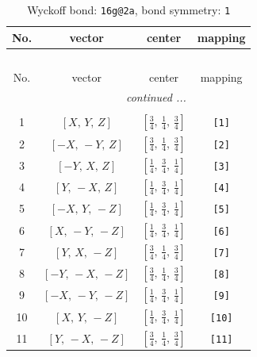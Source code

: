 \documentclass[fleqn,8pt]{jsarticle}
\begin{document}
\begin{longtable}{cccc}
\caption{Wyckoff bond: {\tt 16g@2a}, bond symmetry: {\tt 1}}
 \\
 \hline \hline
No. & vector & center & mapping \\ \hline \endfirsthead

\multicolumn{3}{l}{\tablename\ \thetable{}} \\
 \hline \hline
No. & vector & center & mapping \\ \hline \endhead

 \hline \hline
\multicolumn{3}{r}{\footnotesize\it continued ...} \\ \endfoot

 \hline \hline
\multicolumn{3}{r}{} \\ \endlastfoot

1 & $\left[ X,\, Y,\, Z \right]$ & $\left[ \frac{3}{4},\, \frac{1}{4},\, \frac{3}{4} \right]$ & {\tt [1]} \\ \hline
2 & $\left[ - X,\, - Y,\, Z \right]$ & $\left[ \frac{3}{4},\, \frac{1}{4},\, \frac{3}{4} \right]$ & {\tt [2]} \\ \hline
3 & $\left[ - Y,\, X,\, Z \right]$ & $\left[ \frac{1}{4},\, \frac{3}{4},\, \frac{1}{4} \right]$ & {\tt [3]} \\ \hline
4 & $\left[ Y,\, - X,\, Z \right]$ & $\left[ \frac{1}{4},\, \frac{3}{4},\, \frac{1}{4} \right]$ & {\tt [4]} \\ \hline
5 & $\left[ - X,\, Y,\, - Z \right]$ & $\left[ \frac{1}{4},\, \frac{3}{4},\, \frac{1}{4} \right]$ & {\tt [5]} \\ \hline
6 & $\left[ X,\, - Y,\, - Z \right]$ & $\left[ \frac{1}{4},\, \frac{3}{4},\, \frac{1}{4} \right]$ & {\tt [6]} \\ \hline
7 & $\left[ Y,\, X,\, - Z \right]$ & $\left[ \frac{3}{4},\, \frac{1}{4},\, \frac{3}{4} \right]$ & {\tt [7]} \\ \hline
8 & $\left[ - Y,\, - X,\, - Z \right]$ & $\left[ \frac{3}{4},\, \frac{1}{4},\, \frac{3}{4} \right]$ & {\tt [8]} \\ \hline
9 & $\left[ - X,\, - Y,\, - Z \right]$ & $\left[ \frac{1}{4},\, \frac{3}{4},\, \frac{1}{4} \right]$ & {\tt [9]} \\ \hline
10 & $\left[ X,\, Y,\, - Z \right]$ & $\left[ \frac{1}{4},\, \frac{3}{4},\, \frac{1}{4} \right]$ & {\tt [10]} \\ \hline
11 & $\left[ Y,\, - X,\, - Z \right]$ & $\left[ \frac{3}{4},\, \frac{1}{4},\, \frac{3}{4} \right]$ & {\tt [11]} \\ \hline

\end{longtable}
\end{document}
